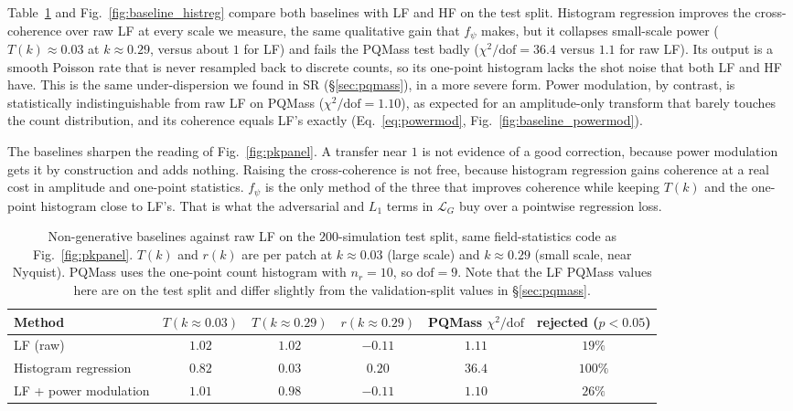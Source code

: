 \documentclass{article} %
\begin{document}
Table~\ref{tab:baselines} and Fig.~\ref{fig:baseline_histreg} compare both
baselines with LF and HF on the test split. Histogram regression improves the
cross-coherence over raw LF at every scale we measure, the same qualitative gain
that $f_\psi$ makes, but it collapses small-scale power ($T(k)\approx0.03$ at
$k\approx0.29$, versus about $1$ for LF) and fails the PQMass test badly
($\chi^2/\mathrm{dof}=36.4$ versus $1.1$ for raw LF). Its output is a smooth Poisson
rate that is never resampled back to discrete counts, so its one-point histogram
lacks the shot noise that both LF and HF have. This is the same under-dispersion we
found in SR (\S\ref{sec:pqmass}), in a more severe form. Power modulation, by
contrast, is statistically indistinguishable from raw LF on PQMass
($\chi^2/\mathrm{dof}=1.10$), as expected for an amplitude-only transform that
barely touches the count distribution, and its coherence equals LF's exactly
(Eq.~\ref{eq:powermod}, Fig.~\ref{fig:baseline_powermod}).

The baselines sharpen the reading of Fig.~\ref{fig:pkpanel}. A transfer near $1$ is
not evidence of a good correction, because power modulation gets it by construction
and adds nothing. Raising the cross-coherence is not free, because histogram
regression gains coherence at a real cost in amplitude and one-point statistics.
$f_\psi$ is the only method of the three that improves coherence while keeping
$T(k)$ and the one-point histogram close to LF's. That is what the adversarial and
$L_1$ terms in $\mathcal{L}_G$ buy over a pointwise regression loss.

\begin{table}[t]
\centering
\caption{Non-generative baselines against raw LF on the $200$-simulation test
split, same field-statistics code as Fig.~\ref{fig:pkpanel}. $T(k)$ and $r(k)$ are
per patch at $k\approx0.03$ (large scale) and $k\approx0.29$ (small scale, near
Nyquist). PQMass uses the one-point count histogram with $n_r=10$, so
$\mathrm{dof}=9$. Note that the LF PQMass values here are on the test split and
differ slightly from the validation-split values in \S\ref{sec:pqmass}.}
\label{tab:baselines}
\begin{tabular}{lccccc}
\toprule
Method & $T(k{\approx}0.03)$ & $T(k{\approx}0.29)$ & $r(k{\approx}0.29)$ & PQMass $\chi^2/\mathrm{dof}$ & rejected ($p{<}0.05$) \\
\midrule
LF (raw)                    & $1.02$ & $1.02$ & $-0.11$ & $1.11$ & $19\%$ \\
Histogram regression        & $0.82$ & $0.03$ & $\mathbf{0.20}$ & $36.4$ & $100\%$ \\
LF + power modulation       & $1.01$ & $0.98$ & $-0.11$ & $1.10$ & $26\%$ \\
\bottomrule
\end{tabular}
\end{table}
\end{document}
